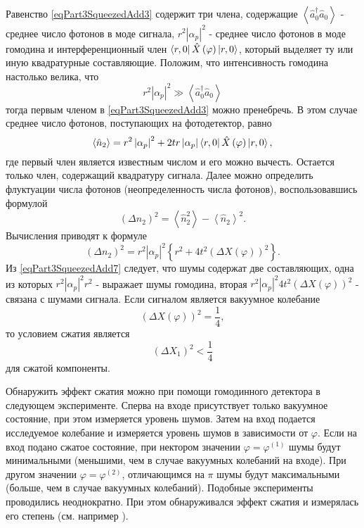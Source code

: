Равенство \eqref{eqPart3SqueezedAdd3} содержит три члена, содержащие 
$\left<\hat{a}_0^{\dag}\hat{a}_0\right>$ - среднее число фотонов в моде
сигнала, $r^2\left|\alpha_p\right|^2$ - среднее число фотонов в моде
гомодина и интерференционный член 
$\bra{r, 0}\hat{X}\left(\varphi\right)\ket{r, 0}$,
который выделяет ту или иную квадратурные составляющие. Положим, что
интенсивность гомодина настолько велика, что 
\[
r^2 \left|\alpha_p\right|^2 \gg 
\left<\hat{a}_0^{\dag}\hat{a}_0\right>
\]
тогда первым членом в \eqref{eqPart3SqueezedAdd3} можно пренебречь. В
этом случае среднее число фотонов, поступающих на фотодетектор, равно
\begin{equation}
\left<\hat{n}_2\right> = 
r^2 \left|\alpha_p\right|^2 + 2 t r \left|\alpha_p\right|
\bra{r, 0}\hat{X}\left(\varphi\right)\ket{r, 0},
\nonumber
\end{equation}
где первый член является известным числом и его можно
вычесть. Остается только член, содержащий квадратуру сигнала. Далее
можно определить флуктуации числа фотонов (неопределенность числа
фотонов), воспользовавшись формулой
\begin{equation}
\left(\Delta n_2\right)^2 = 
\left<\hat{n}_2^2\right>
-
\left<\hat{n}_2\right>^2.
\nonumber
\end{equation}
Вычисления приводят к формуле
\begin{equation}
\left(\Delta n_2\right)^2 =
r^2 \left|\alpha_p\right|^2
\left\{
r^2 + 4 t^2 
\left(
\Delta X \left(\varphi\right)
\right)^2
\right\}.
\label{eqPart3SqueezedAdd7}
\end{equation}
Из \eqref{eqPart3SqueezedAdd7} следует, что шумы содержат две
составляющих, одна из которых $r^2 \left|\alpha_p\right|^2 r^2$ -
выражает шумы гомодина, вторая 
$r^2 \left|\alpha_p\right|^2 4 t^2 
\left(
\Delta X \left(\varphi\right)
\right)^2$ -  связана с шумами сигнала. Если сигналом является вакуумное
колебание 
\[
\left(\Delta X \left(\varphi\right)\right)^2  = \frac{1}{4},
\] 
то условием сжатия является 
\[
\left(\Delta X_1 \right)^2 < \frac{1}{4}
\]
для сжатой компоненты. 

Обнаружить эффект сжатия можно при помощи
гомодинного детектора в следующем эксперименте. Сперва на входе
присутствует только вакуумное состояние, при этом измеряется уровень
шумов. Затем на вход подается исследуемое колебание и измеряется
уровень шумов в зависимости от $\varphi$. Если на вход подано сжатое
состояние, при нектором значении $\varphi = \varphi^{(1)}$ шумы будут
минимальными (меньшими, чем в случае вакуумных колебаний на входе). При
другом значении $\varphi = \varphi^{(2)}$, отличающимся на $\pi$ шумы
будут максимальными (больше, чем в случае вакуумных
колебаний). Подобные эксперименты проводились неоднократно. При этом
обнаруживался эффект сжатия и измерялась его степень (см. например
\cite{bNonclassSqueezedStateDetection}). 


